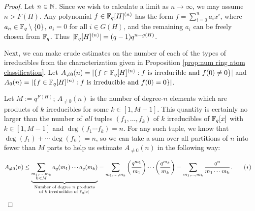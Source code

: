 \begin{proof}
	Let $n\in \mathbb{N}$.
	Since we wish to calculate a limit as $n\to\infty$, we may assume $n> F(H)$.
	Any polynomial $f\in \mathbb{F}_q[H]^{(n)}$ has the form $f = \sum_{i=0}^n a_i x^i$, where $a_n \in \mathbb{F}_q\setminus\{0\}$, $a_i = 0$ for all $i\in G(H)$, and the remaining $a_i$ can be freely chosen from $\mathbb{F}_q$.
	Thus $|\mathbb{F}_q[H]^{(n)}| = (q-1)q^{n-g(H)}$.
	
	Next, we can make crude estimates on the number of each of the types of irreducibles from the characterization given in Proposition \ref{prop:num ring atom classification}.
	Let 
	$A_{\neq0}(n) = | \{f\in \mathbb{F}_q[H]^{(n)}:  f \textrm{ is irreducible and } f(0)\neq 0\}|$ and
	$A_{0}(n) = | \{f\in \mathbb{F}_q[H]^{(n)}:  f \textrm{ is irreducible and } f(0) = 0\}|$.
	
	Let $M := q^{F(H)}$; $A_{\neq0}(n)$ is the number of degree-$n$ elements which are products of $k$ irreducibles for some $k\in [1,M-1]$.
	This quantity is certainly no larger than the number of \textit{all} tuples $(f_1,\dots,f_k)$ of $k$ irreducibles of $\mathbb{F}_q[x]$ with $k\in [1,M-1]$ and $\deg(f_1\cdots f_k) = n$.
	For any such tuple, we know that $\deg(f_1) + \cdots \deg(f_k) = n$, so we can take a sum over all partitions of $n$ into fewer than $M$ parts to help us estimate $A_{\neq0}(n)$ in the following way:
	
	\[ A_{\neq0}(n) \le 
	\underbrace{\sum_{\substack{m_1,\dots, m_k \\ k < M}} a_q(m_1)\cdots a_q(m_k)}_{\substack{\textrm{Number of degree $n$ products} \\ \textrm{of $k$ irreducibles of $\mathbb{F}_q[x]$}}}
	= \sum_{m_1,\dots,m_k} \left(\frac{q^{m_1}}{m_1}\right)\cdots \left(\frac{q^{m_k}}{m_k}\right) 
	=  \sum_{m_1,\dots,m_k} \frac{q^n}{m_1\cdots m_k}. \tag{$*$}
	\]
	

\end{proof}
